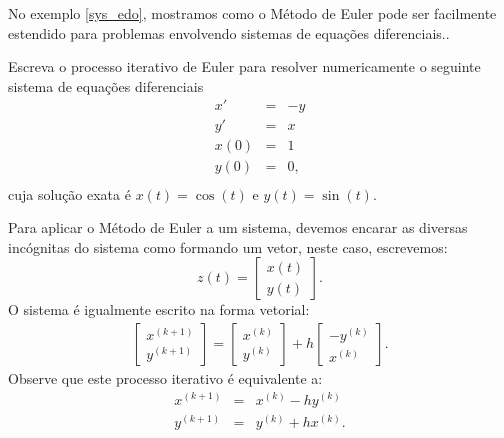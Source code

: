 No exemplo \ref{sys_edo}, mostramos como o Método de Euler pode ser facilmente estendido para problemas envolvendo sistemas de equações diferenciais..
\begin{ex}\label{sys_edo} Escreva o processo iterativo de Euler para resolver numericamente o seguinte sistema de equações diferenciais
\begin{eqnarray*}
x'&=&-y\\
y'&=&x\\
x(0)&=&1\\
y(0)&=&0,\\
\end{eqnarray*}
cuja solução exata é $x(t)=\cos(t)$ e $y(t)=\sin(t)$.
\end{ex}
Para aplicar o Método de Euler a um sistema, devemos encarar as diversas incógnitas do sistema como formando um vetor, neste caso, escrevemos: 
 $$z(t)=\left[\begin{array}{c}x(t)\\y(t)\end{array}\right].$$
 O sistema é igualmente escrito na forma vetorial:
\begin{eqnarray*}
\left[\begin{array}{c}x^{(k+1)}\\y^{(k+1)}\end{array}\right]=\left[\begin{array}{c}x^{(k)}\\y^{(k)}\end{array}\right]+h\left[\begin{array}{c}-y^{(k)}\\x^{(k)}\end{array}\right].
\end{eqnarray*}
Observe que este processo iterativo é equivalente a:
\begin{eqnarray*}
x^{(k+1)}&=&x^{(k)}-hy^{(k)}\\
y^{(k+1)}&=&y^{(k)}+hx^{(k)}.
\end{eqnarray*}



